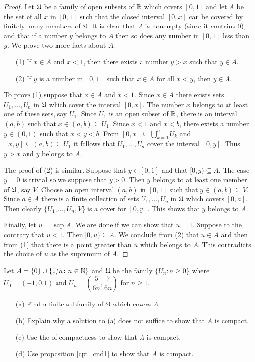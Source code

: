 \begin{proof} Let $\mathfrak{U}$ be a family of open subsets of $\mathbb{R}$ which covers $[0,1]$ and let
$A$ be the set of all $x$ in $[0,1]$ such that the closed interval $[0,x]$ can be covered
by finitely many members of $\mathfrak{U}$. It is clear that $A$ is nonempty (since it
contains 0), and that if a number $y$ belongs to $A$ then so does any number in $[0,1]$
less than $y$. We prove two more facts about $A$:
 \begin{enumerate}
  \item[(1)] If $x\in A$ and $x<1$, then there exists a number $y > x$ such that $y \in A$.
  \item[(2)] If $y$ is a number in $[0,1]$ such that $x \in A$ for all $x < y$, then $y\in A$.
 \end{enumerate}

To prove (1) suppose that $x \in A$ and $x<1$. Since $x \in A$ there exists sets $U_1,
\dots, U_n$ in $\mathfrak{U}$ which cover the interval $[0,x]$. The number $x$ belongs to at
least one of these sets, say $U_1$. Since $U_1$ is an open subset of $\mathbb{R}$, there is an
interval $(a,b)$ such that $x \in (a,b) \subseteq U_1$.  Since $x<1$ and $x<b$, there
exists a number $y \in (0,1)$ such that $x < y < b$.  From $[0,x] \subseteq
\bigcup_{k=1}^n U_k$ and $[x,y] \subseteq (a,b) \subseteq U_1$ it follows that $U_1,
\dots, U_n$ cover the interval $[0,y]$. Thus $y > x$ and $y$ belongs to $A$.

The proof of (2) is similar. Suppose that $y \in [0,1]$ and that $[0,y) \subseteq A$. The
case $y=0$ is trivial so we suppose that $y>0$. Then $y$ belongs to at least one member
of $\mathfrak{U}$, say $V$. Choose an open interval $(a,b)$ in $[0,1]$ such that $y \in (a,b)
\subseteq V$. Since $a \in A$ there is a finite collection of sets $U_1, \dots, U_n$ in
$\mathfrak{U}$ which covers $[0,a]$. Then clearly $\{U_1, \dots, U_n, V\}$ is a cover for
$[0,y]$. This shows that $y$ belongs to $A$.

Finally, let $u = \sup A$. We are done if we can show that $u = 1$. Suppose to the contrary
that $u<1$. Then $[0,u) \subseteq A$. We conclude from (2) that $u \in A$ and then from (1)
that there is a point greater than $u$ which belongs to $A$.  This contradicts the choice of
$u$ as the supremum of $A$.
\end{proof}

\begin{prob} Let $A = \{0\} \cup \{1/n \colon n \in \mathbb{N}\}$ and $\mathfrak{U}$ be the family
$\{U_n \colon n \ge 0\}$ where $U_0 = (-1,0.1)$ and $U_n = \left(\dfrac 5{6n},\dfrac
7{6n}\right)$ for $n \ge 1$.
 \begin{enumerate}
  \item[(a)] Find a finite subfamily of $\mathfrak{U}$ which covers $A$.
  \item[(b)] Explain why a solution to (a) does not suffice to show
that $A$ is compact.
  \item[(c)] Use the  of compactness to show that
$A$ is compact.
  \item[(d)] Use proposition \ref{cpt_cnd1} to show that $A$ is
compact.
 \end{enumerate}
\end{prob}

